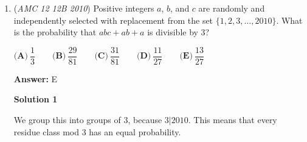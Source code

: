 \begin{enumerate}
 \textbf{Answer: }D



\textbf{Solution}

We have either $i^{x}=(1+i)^{y}\neq z$, $i^{x}=z\neq(1+i)^{y}$, or $(1+i)^{y}=z\neq i^x$.

 $i^{x}=(1+i)^{y}$ only occurs when it is $1$. $(1+i)^{y}=1$ has only one solution, namely, $y=0$. $i^{x}=1$ has five solutions between 0 and 19, $x=0, x=4, x=8, x=12$, and $x=16$. $z\neq 1$ has nineteen integer solutions between zero and nineteen. So for $i^{x}=(1+i)^{y}\neq z$, we have $5\cdot 1\cdot 19=95$ ordered triples.

 For $i^{x}=z\neq(1+i)^{y}$, again this only occurs at $1$. $(1+i)^{y}\neq 1$ has nineteen solutions, $i^{x}=1$ has five solutions, and $z=1$ has one solution, so again we have $5\cdot 1\cdot 19=95$ ordered triples.

 For $(1+i)^{y}=z\neq i^x$, this occurs at $1$ and $16$. $(1+i)^{y}=1$ and $z=1$ both have one solution while $i^{x}\neq 1$ has fifteen solutions. $(1+i)^{y}=16$ and $z=16$ both have one solution, namely, $y=8$ and $z=16$, while $i^{x}\neq 16$ has twenty solutions ($i^x$ only cycles as $1, i, -1, -i$). So we have $15\cdot 1\cdot 1+20\cdot 1\cdot 1=35$ ordered triples.

 In total we have ${95+95+35=\boxed{\text{(D) }225}}$ ordered triples

 \textbf{Small Clarification} To more clearly see why the reasoning above is true, try converting the complex numbers into exponential form. That way, we can more easily raise the numbers to $x$, $y$ and $z$ respectively.

 


	\item (\textit{AMC 12 12B 2010}) Positive integers $a$, $b$, and $c$ are randomly and independently selected with replacement from the set $\{1, 2, 3,\dots, 2010\}$. What is the probability that $abc + ab + a$ is divisible by $3$?


 $\textbf{(A)}\ \dfrac{1}{3} \qquad \textbf{(B)}\ \dfrac{29}{81} \qquad \textbf{(C)}\ \dfrac{31}{81} \qquad \textbf{(D)}\ \dfrac{11}{27} \qquad \textbf{(E)}\ \dfrac{13}{27}$

 \textbf{Answer: }E



\textbf{Solution 1}

We group this into groups of $3$, because $3|2010$. This means that every residue class mod 3 has an equal probability.


\end{enumerate}
